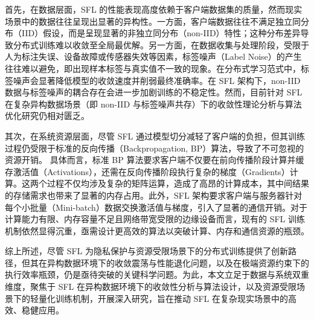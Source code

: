 首先，在数据层面，SFL 的性能表现高度依赖于客户端数据集的质量，然而现实场景中的数据往往呈现出显著的异构性。一方面，客户端数据往往不满足独立同分布（IID）假设，而是呈现显著的非独立同分布（non-IID）特性；这种分布差异导致分布式训练难以收敛至全局最优解。另一方面，在数据收集与处理阶段，受限于人为标注失误、设备故障或传感器失效等因素，标签噪声（Label Noise）的产生往往难以避免，即出现样本标签与真实值不一致的现象。在分布式学习范式中，标签噪声会显著降低模型的收敛速度并削弱最终准确率。在 SFL 架构下，non-IID 数据与标签噪声的耦合存在会进一步加剧训练的不稳定性。然而，目前针对 SFL 在复杂异构数据场景（即 non-IID 与标签噪声共存）下的收敛性理论分析与算法优化研究仍相对匮乏。


其次，在系统资源层面，尽管 SFL 通过模型切分减轻了客户端的负担，但其训练过程仍受限于标准的反向传播（Backpropagation, BP）算法，导致了不可忽视的资源开销。 具体而言，标准 BP 算法要求客户端不仅要在前向传播阶段计算并缓存激活值（Activations），还需在反向传播阶段执行复杂的梯度（Gradients）计算。这两个过程不仅均涉及复杂的矩阵运算，造成了高昂的计算成本，其中间结果的存储需求也带来了显著的内存占用。此外，SFL 架构要求客户端与服务器针对每个小批量（Mini-batch）数据交换激活值与梯度，引入了显著的通信开销。对于计算能力有限、内存容量不足且网络带宽受限的边缘设备而言，现有的 SFL 训练机制依然显得沉重，亟需设计更高效的算法以突破计算、内存和通信资源的瓶颈。


综上所述，尽管 SFL 为隐私保护与资源受限场景下的分布式训练提供了创新路径，但其在异构数据环境下的收敛震荡与性能退化问题，以及在极端资源约束下的执行效率瓶颈，仍是亟待突破的关键科学问题。为此，本文立足于数据与系统双重维度，聚焦于 SFL 在异构数据环境下的收敛性分析与算法设计，以及资源受限场景下的轻量化训练机制，开展深入研究，旨在推动 SFL 在复杂现实场景中的高效、稳健应用。
